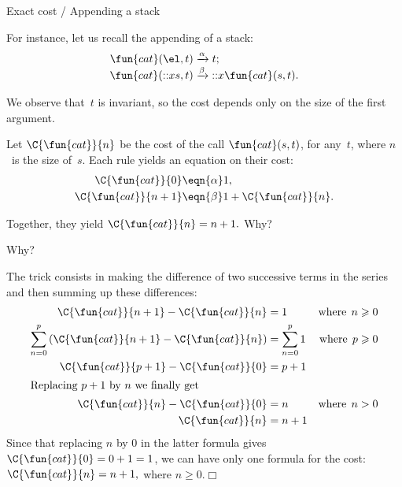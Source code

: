 %
\begin{frame}{Exact cost / Appending a stack}

  For instance, let us recall the appending of a stack:
  \begin{align*}
    \fun{cat}(        \el,t) &\xrightarrow{\alpha} t;\\
    \fun{cat}(\cons{x}{s},t) &\xrightarrow{\smash{\beta}}
    \cons{x}{\fun{cat}(s,t)}.
  \end{align*}

  We observe that~\(t\) is invariant, so the cost depends only on the
  size of the first argument.

  \bigskip

  Let \(\C{\fun{cat}}{n}\) be the cost of the call \(\fun{cat}(s,t)\),
  for any~\(t\), where \(n\)~is the size of~\(s\). Each rule yields an
  equation on their cost:
  \begin{align*}
    \C{\fun{cat}}{0} & \eqn{\alpha} 1,\\
    \C{\fun{cat}}{n+1} & \eqn{\smash{\beta}} 1 + \C{\fun{cat}}{n}.
  \end{align*}

  Together, they yield \(\C{\fun{cat}}{n} = n + 1.\) Why?

\end{frame}

%
\begin{frame}{Why?}

  The trick consists in making the difference of two successive terms
  in the series and then summing up these differences:
  \begin{align*}
    \C{\fun{cat}}{n+1} - \C{\fun{cat}}{n} &= 1 & \text{where} \;\, n
    \geqslant 0\\
    \sum_{n=0}^{p}{(\C{\fun{cat}}{n+1} - \C{\fun{cat}}{n})} &=
    \sum_{n=0}^{p}{1} & \text{where} \;\, p \geqslant 0\\
    \C{\fun{cat}}{p+1} - \C{\fun{cat}}{0} &= p + 1\\
    \intertext{Replacing \(p+1\) by \(n\) we finally get}
    \C{\fun{cat}}{n} - \C{\fun{cat}}{0} &= n & \text{where}\;\, n > 0\\
    \C{\fun{cat}}{n}  &= n + 1
  \end{align*}
  Since that replacing \(n\) by \(0\) in the latter formula gives
  \(\C{\fun{cat}}{0} = 0 + 1 = 1\), we can have only one formula for
  the cost: \(\C{\fun{cat}}{n} = n + 1,\) where \(n \geqslant
  0.\)\hfill\(\Box\)

\end{frame}

